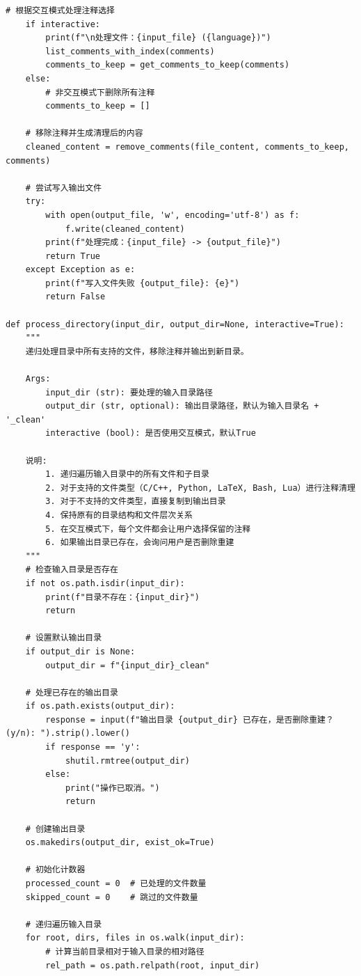 \begin{lstlisting}[style=pythonstyle, title={递归删除整个文件夹中注释.py}]
    # 根据交互模式处理注释选择
    if interactive:
        print(f"\n处理文件：{input_file} ({language})")
        list_comments_with_index(comments)
        comments_to_keep = get_comments_to_keep(comments)
    else:
        # 非交互模式下删除所有注释
        comments_to_keep = []

    # 移除注释并生成清理后的内容
    cleaned_content = remove_comments(file_content, comments_to_keep, comments)

    # 尝试写入输出文件
    try:
        with open(output_file, 'w', encoding='utf-8') as f:
            f.write(cleaned_content)
        print(f"处理完成：{input_file} -> {output_file}")
        return True
    except Exception as e:
        print(f"写入文件失败 {output_file}: {e}")
        return False

def process_directory(input_dir, output_dir=None, interactive=True):
    """
    递归处理目录中所有支持的文件，移除注释并输出到新目录。
    
    Args:
        input_dir (str): 要处理的输入目录路径
        output_dir (str, optional): 输出目录路径，默认为输入目录名 + '_clean'
        interactive (bool): 是否使用交互模式，默认True
        
    说明:
        1. 递归遍历输入目录中的所有文件和子目录
        2. 对于支持的文件类型（C/C++, Python, LaTeX, Bash, Lua）进行注释清理
        3. 对于不支持的文件类型，直接复制到输出目录
        4. 保持原有的目录结构和文件层次关系
        5. 在交互模式下，每个文件都会让用户选择保留的注释
        6. 如果输出目录已存在，会询问用户是否删除重建
    """
    # 检查输入目录是否存在
    if not os.path.isdir(input_dir):
        print(f"目录不存在：{input_dir}")
        return
    
    # 设置默认输出目录
    if output_dir is None:
        output_dir = f"{input_dir}_clean"
    
    # 处理已存在的输出目录
    if os.path.exists(output_dir):
        response = input(f"输出目录 {output_dir} 已存在，是否删除重建？(y/n): ").strip().lower()
        if response == 'y':
            shutil.rmtree(output_dir)
        else:
            print("操作已取消。")
            return
    
    # 创建输出目录
    os.makedirs(output_dir, exist_ok=True)
    
    # 初始化计数器
    processed_count = 0  # 已处理的文件数量
    skipped_count = 0    # 跳过的文件数量
    
    # 递归遍历输入目录
    for root, dirs, files in os.walk(input_dir):
        # 计算当前目录相对于输入目录的相对路径
        rel_path = os.path.relpath(root, input_dir)
        

\end{lstlisting}
